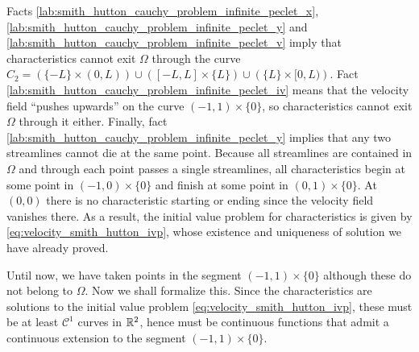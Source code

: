 Facts \ref{lab:smith_hutton_cauchy_problem_infinite_peclet_x}, \ref{lab:smith_hutton_cauchy_problem_infinite_peclet_y} and \ref{lab:smith_hutton_cauchy_problem_infinite_peclet_v} imply that characteristics cannot exit $\Omega$ through the curve $C_2 = \left( \{ -L \} \times (0,L) \right) \cup \left( [-L,L] \times \{ L \} \right) \cup \left( \{ L \} \times [0,L) \right)$. Fact \eqref{lab:smith_hutton_cauchy_problem_infinite_peclet_iv} means that the velocity field ``pushes upwards'' on the curve $(-1,1) \times \{ 0 \}$, so characteristics cannot exit $\Omega$ through it either. Finally, fact \ref{lab:smith_hutton_cauchy_problem_infinite_peclet_y} implies that any two streamlines cannot die at the same point. Because all streamlines are contained in $\Omega$ and through each point passes a single streamlines, all characteristics begin at some point in $(-1,0) \times \{ 0 \}$ and finish at some point in $(0,1) \times \{ 0 \}$. At $(0,0)$ there is no characteristic starting or ending since the velocity field vanishes there. As a result, the initial value problem for characteristics is given by \eqref{eq:velocity_smith_hutton_ivp}, whose existence and uniqueness of solution we have already proved. 

Until now, we have taken points in the segment $(-1,1) \times \{ 0 \}$ although these do not belong to $\Omega$. Now we shall formalize this. Since the characteristics are solutions to the initial value problem \eqref{eq:velocity_smith_hutton_ivp}, these must be at least $\mathcal{C}^1$ curves in $\mathbb{R}^2$, hence must be continuous functions that admit a continuous extension to the segment $(-1,1) \times \{ 0 \}$.

